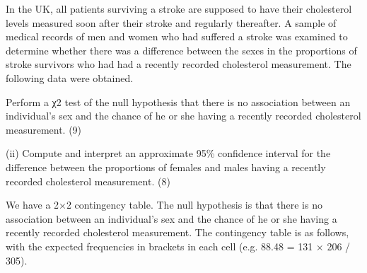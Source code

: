 


In the UK, all patients surviving a stroke are supposed to have their cholesterol
levels measured soon after their stroke and regularly thereafter. A sample of
medical records of men and women who had suffered a stroke was examined
to determine whether there was a difference between the sexes in the
proportions of stroke survivors who had had a recently recorded cholesterol
measurement. The following data were obtained. 


Perform a χ2
test of the null hypothesis that there is no association
between an individual's sex and the chance of he or she having a
recently recorded cholesterol measurement.
(9)

(ii) Compute and interpret an approximate 95\% confidence interval for the
difference between the proportions of females and males having a
recently recorded cholesterol measurement.
(8) 


We have a 2×2 contingency table. The null hypothesis is that there is no
association between an individual's sex and the chance of he or she having a
recently recorded cholesterol measurement. The contingency table is as
follows, with the expected frequencies in brackets in each cell (e.g. 88.48 =
131 × 206 / 305). 


